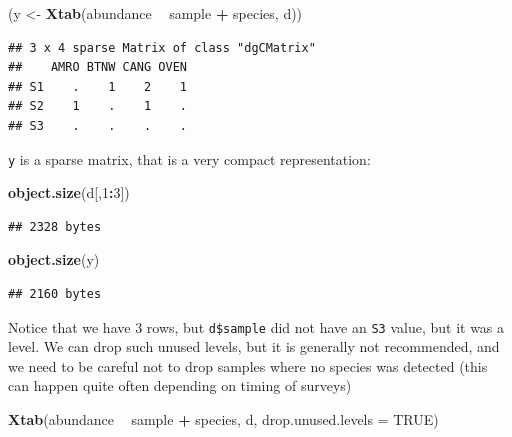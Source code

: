 \documentclass[12pt,]{book}
\newenvironment{Shaded}{\begin{snugshade}}{\end{snugshade}}
\newcommand{\DataTypeTok}[1]{\textcolor[rgb]{0.13,0.29,0.53}{#1}}
\newcommand{\DecValTok}[1]{\textcolor[rgb]{0.00,0.00,0.81}{#1}}
\newcommand{\KeywordTok}[1]{\textcolor[rgb]{0.13,0.29,0.53}{\textbf{#1}}}
\newcommand{\NormalTok}[1]{#1}
\newcommand{\OperatorTok}[1]{\textcolor[rgb]{0.81,0.36,0.00}{\textbf{#1}}}
\newcommand{\OtherTok}[1]{\textcolor[rgb]{0.56,0.35,0.01}{#1}}
\newcommand{\StringTok}[1]{\textcolor[rgb]{0.31,0.60,0.02}{#1}}
\begin{document}
\begin{Shaded}
\begin{Highlighting}[]
\NormalTok{(y <-}\StringTok{ }\KeywordTok{Xtab}\NormalTok{(abundance }\OperatorTok{~}\StringTok{ }\NormalTok{sample }\OperatorTok{+}\StringTok{ }\NormalTok{species, d))}
\end{Highlighting}
\end{Shaded}

\begin{verbatim}
## 3 x 4 sparse Matrix of class "dgCMatrix"
##    AMRO BTNW CANG OVEN
## S1    .    1    2    1
## S2    1    .    1    .
## S3    .    .    .    .
\end{verbatim}

\texttt{y} is a sparse matrix, that is a very compact representation:

\begin{Shaded}
\begin{Highlighting}[]
\KeywordTok{object.size}\NormalTok{(d[,}\DecValTok{1}\OperatorTok{:}\DecValTok{3}\NormalTok{])}
\end{Highlighting}
\end{Shaded}

\begin{verbatim}
## 2328 bytes
\end{verbatim}

\begin{Shaded}
\begin{Highlighting}[]
\KeywordTok{object.size}\NormalTok{(y)}
\end{Highlighting}
\end{Shaded}

\begin{verbatim}
## 2160 bytes
\end{verbatim}

Notice that we have 3 rows, but \texttt{d\$sample} did not have an \texttt{S3} value, but it was a level.
We can drop such unused levels, but it is generally not recommended, and we need to be careful
not to drop samples where no species was detected (this can happen quite often depending on timing of
surveys)

\begin{Shaded}
\begin{Highlighting}[]
\KeywordTok{Xtab}\NormalTok{(abundance }\OperatorTok{~}\StringTok{ }\NormalTok{sample }\OperatorTok{+}\StringTok{ }\NormalTok{species, d, }\DataTypeTok{drop.unused.levels =} \OtherTok{TRUE}\NormalTok{)}
\end{Highlighting}
\end{Shaded}
\end{document}
